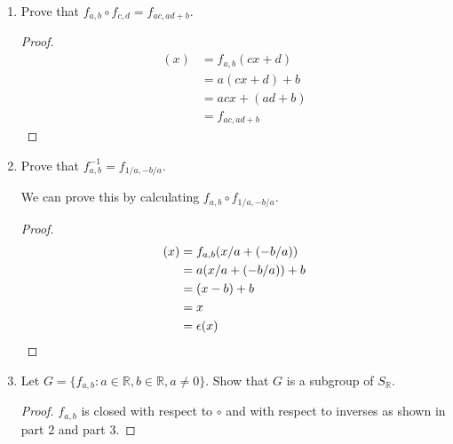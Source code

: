 \documentclass[twoside]{amsart}
\newcommand{\Reals}{\ensuremath{\mathbb{R}}\xspace}
\newcommand{\eps}{\ensuremath{\epsilon}\xspace}
\begin{document}
\begin{enumerate}[A.]
\begin{enumerate}[1]
      Next we will show that $f_{a,b}$ is both injective and surjective
      and therefore is a permutation of $S_\Reals$.

      \begin{proof}
      $f_{a,b}$ is injective:
         Suppose $f_{a,b}(s) = f_{a,b}(t)$. Then $as+b = at+b$, and
	 $as=at$ and $s=t$ (we know $a \ne 0$).

      $f_{a,b}$ is surjective:
         For all $y \in \Reals$, $y=f_{a,b}(x)$ for $x = (y-b)/a$.

      Therefore $f_{a,b}$ is a permutation of $S_\Reals$.
      \end{proof}

      \item Prove that $f_{a,b} \circ f_{c,d} = f_{ac,ad+b}$.

      \begin{proof}
      \begin{align*}
         [f_{a,b} \circ f_{c,d}](x) &= f_{a,b}(cx+d) \\
	                            &= a(cx+d) + b \\
				    &= acx + (ad+b) \\
				    &= f_{ac,ad+b}
      \end{align*}
      \end{proof}

      \item Prove that $f_{a,b}^{-1} = f_{1/a,-b/a}$.

      We can prove this by calculating $f_{a,b} \circ f_{1/a,-b/a}$.
      \begin{proof}
      \begin{align*}
          [f_{a,b} \circ f_{1/a,-b/a}](x) &= f_{a,b}(x/a+(-b/a)) \\
	                                  &= a(x/a+(-b/a))+b \\
					  &= (x-b)+b \\
					  &= x \\
					  &= \eps(x) \qedhere
      \end{align*}
      \end{proof}

      \item Let $G=\{f_{a,b} : a \in \Reals, b \in \Reals, a \ne 0 \}$.
      Show that $G$ is a subgroup of $S_\Reals$.

      \begin{proof}
      $f_{a,b}$ is closed with respect to $\circ$ and with respect to 
      inverses as shown in part 2 and part 3.
      \end{proof}


\end{enumerate}
\end{enumerate}
\end{document}

